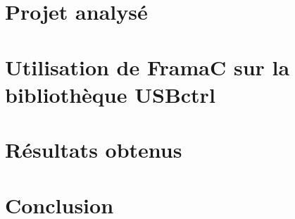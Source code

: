 \documentclass[10pt,french,twoside,a4paper]{report}
\begin{document}
\cleardoublepage
\chapter{Projet analysé}\label{chapitre_3}


\cleardoublepage
\chapter{Utilisation de FramaC sur la bibliothèque USBctrl}\label{chapitre_4}

%
\cleardoublepage
\chapter{Résultats obtenus}\label{chapitre_5}

%
\cleardoublepage
{}
\chapter{Conclusion}
\resetsecnumdepth\resettocdepth

%
%
%
\cleardoublepage
\appendix
\end{document}
